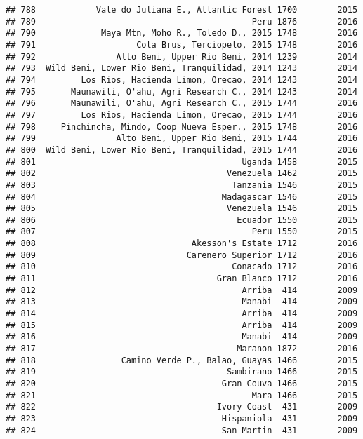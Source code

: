 \documentclass[
]{article}
\begin{document}
\begin{verbatim}
## 788            Vale do Juliana E., Atlantic Forest 1700        2015
## 789                                           Peru 1876        2016
## 790             Maya Mtn, Moho R., Toledo D., 2015 1748        2016
## 791                    Cota Brus, Terciopelo, 2015 1748        2016
## 792                Alto Beni, Upper Rio Beni, 2014 1239        2014
## 793  Wild Beni, Lower Rio Beni, Tranquilidad, 2014 1243        2014
## 794         Los Rios, Hacienda Limon, Orecao, 2014 1243        2014
## 795       Maunawili, O'ahu, Agri Research C., 2014 1243        2014
## 796       Maunawili, O'ahu, Agri Research C., 2015 1744        2016
## 797         Los Rios, Hacienda Limon, Orecao, 2015 1744        2016
## 798     Pinchincha, Mindo, Coop Nueva Esper., 2015 1748        2016
## 799                Alto Beni, Upper Rio Beni, 2015 1744        2016
## 800  Wild Beni, Lower Rio Beni, Tranquilidad, 2015 1744        2016
## 801                                         Uganda 1458        2015
## 802                                      Venezuela 1462        2015
## 803                                       Tanzania 1546        2015
## 804                                     Madagascar 1546        2015
## 805                                      Venezuela 1546        2015
## 806                                        Ecuador 1550        2015
## 807                                           Peru 1550        2015
## 808                               Akesson's Estate 1712        2016
## 809                              Carenero Superior 1712        2016
## 810                                       Conacado 1712        2016
## 811                                    Gran Blanco 1712        2016
## 812                                         Arriba  414        2009
## 813                                         Manabi  414        2009
## 814                                         Arriba  414        2009
## 815                                         Arriba  414        2009
## 816                                         Manabi  414        2009
## 817                                        Maranon 1872        2016
## 818                 Camino Verde P., Balao, Guayas 1466        2015
## 819                                      Sambirano 1466        2015
## 820                                     Gran Couva 1466        2015
## 821                                           Mara 1466        2015
## 822                                    Ivory Coast  431        2009
## 823                                     Hispaniola  431        2009
## 824                                     San Martin  431        2009

\end{verbatim}
\end{document}
